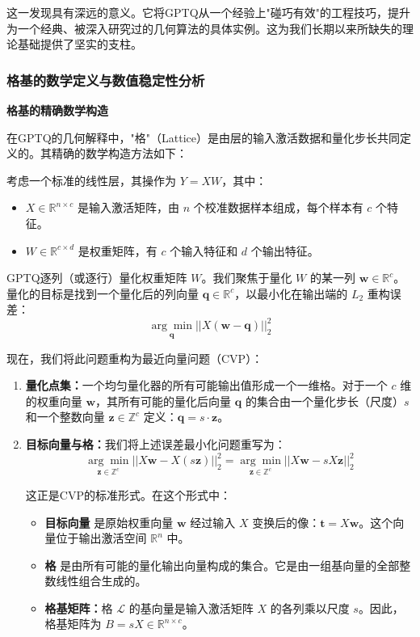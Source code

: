 \documentclass[letterpaper,twocolumn,10pt]{article}
\begin{document}
这一发现具有深远的意义。它将GPTQ从一个经验上"碰巧有效"的工程技巧，提升为一个经典、被深入研究过的几何算法的具体实例。这为我们长期以来所缺失的理论基础提供了坚实的支柱。

\subsubsection{格基的数学定义与数值稳定性分析}

\textbf{格基的精确数学构造}

在GPTQ的几何解释中，"格"（Lattice）是由层的输入激活数据和量化步长共同定义的。其精确的数学构造方法如下：

考虑一个标准的线性层，其操作为 $Y = XW$，其中：
\begin{itemize}
\item $X \in \mathbb{R}^{n \times c}$ 是输入激活矩阵，由 $n$ 个校准数据样本组成，每个样本有 $c$ 个特征。
\item $W \in \mathbb{R}^{c \times d}$ 是权重矩阵，有 $c$ 个输入特征和 $d$ 个输出特征。
\end{itemize}

GPTQ逐列（或逐行）量化权重矩阵 $W$。我们聚焦于量化 $W$ 的某一列 $\mathbf{w} \in \mathbb{R}^{c}$。量化的目标是找到一个量化后的列向量 $\mathbf{q} \in \mathbb{R}^{c}$，以最小化在输出端的 $L_2$ 重构误差：
$$\underset{\mathbf{q}}{\arg\min} ||X(\mathbf{w} - \mathbf{q})||_2^2$$

现在，我们将此问题重构为最近向量问题（CVP）：

\begin{enumerate}
\item \textbf{量化点集：}一个均匀量化器的所有可能输出值形成一个一维格。对于一个 $c$ 维的权重向量 $\mathbf{w}$，其所有可能的量化后向量 $\mathbf{q}$ 的集合由一个量化步长（尺度）$s$ 和一个整数向量 $\mathbf{z} \in \mathbb{Z}^{c}$ 定义：$\mathbf{q} = s \cdot \mathbf{z}$。

\item \textbf{目标向量与格：}我们将上述误差最小化问题重写为：
   $$\underset{\mathbf{z} \in \mathbb{Z}^{c}}{\arg\min} ||X\mathbf{w} - X(s\mathbf{z})||_2^2 = \underset{\mathbf{z} \in \mathbb{Z}^{c}}{\arg\min} ||X\mathbf{w} - sX\mathbf{z}||_2^2$$
   
   这正是CVP的标准形式。在这个形式中：
   \begin{itemize}
   \item \textbf{目标向量} 是原始权重向量 $\mathbf{w}$ 经过输入 $X$ 变换后的像：$\mathbf{t} = X\mathbf{w}$。这个向量位于输出激活空间 $\mathbb{R}^{n}$ 中。
   \item \textbf{格} 是由所有可能的量化输出向量构成的集合。它是由一组基向量的全部整数线性组合生成的。
   \item \textbf{格基矩阵：}格 $\mathcal{L}$ 的基向量是输入激活矩阵 $X$ 的各列乘以尺度 $s$。因此，格基矩阵为 $B = sX \in \mathbb{R}^{n \times c}$。
   \end{itemize}
\end{enumerate}
\end{document}

